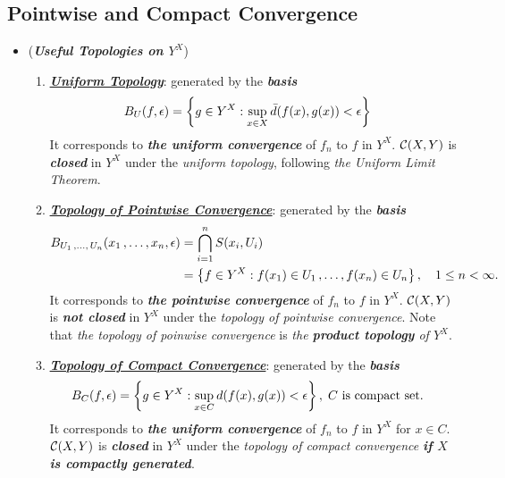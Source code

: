 \documentclass[11pt]{article}
\begin{document}
\subsection{Pointwise and Compact Convergence}
\begin{itemize}
\item \begin{remark} (\emph{\textbf{Useful Topologies on $Y^X$}})
\begin{enumerate}
\item \underline{\emph{\textbf{Uniform Topology}}}: generated by the \emph{\textbf{basis}}
\begin{align*}
B_{U}(f, \epsilon) &= \left\{g \in Y^X: \sup_{x\in X}\bar{d}(f(x), g(x)) < \epsilon \right\}
\end{align*} It corresponds to \emph{\textbf{the uniform convergence}} of $f_n$ to $f$ in $Y^X$. ${\mathcal C}(X, Y)$ is \emph{\textbf{closed}} in $Y^X$ under the \emph{uniform topology}, following \emph{the Uniform Limit Theorem}.

\item  \underline{\emph{\textbf{Topology of Pointwise Convergence}}}: generated by the \emph{\textbf{basis}}
\begin{align*}
B_{U_1 \,{,}\ldots{,}\, U_n}(x_1 \,{,}\ldots{,}\, x_n, \epsilon)  &= \bigcap_{i=1}^{n}S(x_i, U_i) \\
&= \left\{f \in Y^X: f(x_1) \in U_1 \,{,}\ldots{,}\, f(x_n) \in U_n\right\}, \quad   1 \le n < \infty.
\end{align*} It corresponds to \emph{\textbf{the pointwise convergence}} of $f_n$ to $f$ in $Y^X$. ${\mathcal C}(X, Y)$ is \emph{\textbf{not closed}} in $Y^X$ under the \emph{topology of pointwise convergence}. Note that \emph{the topology of poinwise convergence} is \emph{the \textbf{product topology} of $Y^X$}.

\item \underline{\emph{\textbf{Topology of Compact Convergence}}}: generated by the \emph{\textbf{basis}}
\begin{align*}
B_{C}(f, \epsilon) &= \left\{g \in Y^X: \sup_{x \in C}d(f (x), g(x)) < \epsilon \right\},\; C \text{ is compact set}.
\end{align*} It corresponds to \emph{\textbf{the uniform convergence}} of $f_n$ to $f$ in $Y^X$ for $x \in C$. ${\mathcal C}(X, Y)$ is \emph{\textbf{closed}} in $Y^X$ under the \emph{topology of compact convergence} \emph{\textbf{if $X$ is compactly generated}}.


\end{enumerate}
\end{remark}
\end{itemize}
\end{document}

